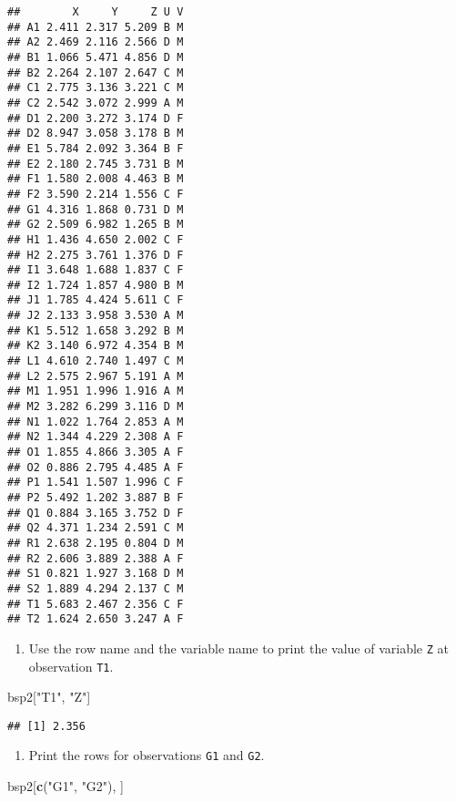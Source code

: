 \documentclass[]{article}
\newenvironment{Shaded}{\begin{snugshade}}{\end{snugshade}}
\newcommand{\KeywordTok}[1]{\textcolor[rgb]{0.13,0.29,0.53}{\textbf{#1}}}
\newcommand{\StringTok}[1]{\textcolor[rgb]{0.31,0.60,0.02}{#1}}
\newcommand{\NormalTok}[1]{#1}
\providecommand{\tightlist}{%
  \setlength{\itemsep}{0pt}\setlength{\parskip}{0pt}}
\begin{document}
\begin{verbatim}
##        X     Y     Z U V
## A1 2.411 2.317 5.209 B M
## A2 2.469 2.116 2.566 D M
## B1 1.066 5.471 4.856 D M
## B2 2.264 2.107 2.647 C M
## C1 2.775 3.136 3.221 C M
## C2 2.542 3.072 2.999 A M
## D1 2.200 3.272 3.174 D F
## D2 8.947 3.058 3.178 B M
## E1 5.784 2.092 3.364 B F
## E2 2.180 2.745 3.731 B M
## F1 1.580 2.008 4.463 B M
## F2 3.590 2.214 1.556 C F
## G1 4.316 1.868 0.731 D M
## G2 2.509 6.982 1.265 B M
## H1 1.436 4.650 2.002 C F
## H2 2.275 3.761 1.376 D F
## I1 3.648 1.688 1.837 C F
## I2 1.724 1.857 4.980 B M
## J1 1.785 4.424 5.611 C F
## J2 2.133 3.958 3.530 A M
## K1 5.512 1.658 3.292 B M
## K2 3.140 6.972 4.354 B M
## L1 4.610 2.740 1.497 C M
## L2 2.575 2.967 5.191 A M
## M1 1.951 1.996 1.916 A M
## M2 3.282 6.299 3.116 D M
## N1 1.022 1.764 2.853 A M
## N2 1.344 4.229 2.308 A F
## O1 1.855 4.866 3.305 A F
## O2 0.886 2.795 4.485 A F
## P1 1.541 1.507 1.996 C F
## P2 5.492 1.202 3.887 B F
## Q1 0.884 3.165 3.752 D F
## Q2 4.371 1.234 2.591 C M
## R1 2.638 2.195 0.804 D M
## R2 2.606 3.889 2.388 A F
## S1 0.821 1.927 3.168 D M
## S2 1.889 4.294 2.137 C M
## T1 5.683 2.467 2.356 C F
## T2 1.624 2.650 3.247 A F
\end{verbatim}

\begin{enumerate}
\def\labelenumi{\arabic{enumi}.}
\setcounter{enumi}{6}
\tightlist
\item
  Use the row name and the variable name to print the value of variable
  \texttt{Z} at observation \texttt{T1}.
\end{enumerate}

\begin{Shaded}
\begin{Highlighting}[]
\NormalTok{bsp2[}\StringTok{"T1"}\NormalTok{, }\StringTok{"Z"}\NormalTok{]}
\end{Highlighting}
\end{Shaded}

\begin{verbatim}
## [1] 2.356
\end{verbatim}

\begin{enumerate}
\def\labelenumi{\arabic{enumi}.}
\setcounter{enumi}{7}
\tightlist
\item
  Print the rows for observations \texttt{G1} and \texttt{G2}.
\end{enumerate}

\begin{Shaded}
\begin{Highlighting}[]
\NormalTok{bsp2[}\KeywordTok{c}\NormalTok{(}\StringTok{"G1"}\NormalTok{, }\StringTok{"G2"}\NormalTok{), ]}
\end{Highlighting}
\end{Shaded}
\end{document}
